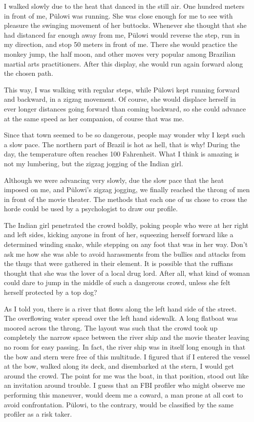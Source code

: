 \documentclass[
  12pt,
]{book}
\begin{document}
I walked slowly due to the heat that danced in the still air. One
hundred meters in front of me, Pülowi was running. She was close enough
for me to see with pleasure the swinging movement of her buttocks.
Whenever she thought that she had distanced far enough away from me,
Pülowi would reverse the step, run in my direction, and stop 50 meters
in front of me. There she would practice the monkey jump, the half moon,
and other moves very popular among Brazilian martial arts practitioners.
After this display, she would run again forward along the chosen path.

This way, I was walking with regular steps, while Pülowi kept running
forward and backward, in a zigzag movement. Of course, she would
displace herself in ever longer distances going forward than coming
backward, so she could advance at the same speed as her companion, of
course that was me.

Since that town seemed to be so dangerous, people may wonder why I kept
such a slow pace. The northern part of Brazil is hot as hell, that is
why! During the day, the temperature often reaches 100 Fahrenheit. What
I think is amazing is not my lumbering, but the zigzag jogging of the
Indian girl.

Although we were advancing very slowly, due the slow pace that the heat
imposed on me, and Pülowi's zigzag jogging, we finally reached the
throng of men in front of the movie theater. The methods that each one
of us chose to cross the horde could be used by a psychologist to draw
our profile.

The Indian girl penetrated the crowd boldly, poking people who were at
her right and left sides, kicking anyone in front of her, squeezing
herself forward like a determined winding snake, while stepping on any
foot that was in her way. Don't ask me how she was able to avoid
harassments from the bullies and attacks from the thugs that were
gathered in their element. It is possible that the ruffians thought that
she was the lover of a local drug lord. After all, what kind of woman
could dare to jump in the middle of such a dangerous crowd, unless she
felt herself protected by a top dog?

As I told you, there is a river that flows along the left hand side of
the street. The overflowing water spread over the left hand sidewalk. A
long flatboat was moored across the throng. The layout was such that the
crowd took up completely the narrow space between the river ship and the
movie theater leaving no room for easy passing. In fact, the river ship
was in itself long enough in that the bow and stern were free of this
multitude. I figured that if I entered the vessel at the bow, walked
along its deck, and disembarked at the stern, I would get around the
crowd. The point for me was the boat, in that position, stood out like
an invitation around trouble. I guess that an FBI profiler who might
observe me performing this maneuver, would deem me a coward, a man prone
at all cost to avoid confrontation. Pülowi, to the contrary, would be
classified by the same profiler as a risk taker.
\end{document}
